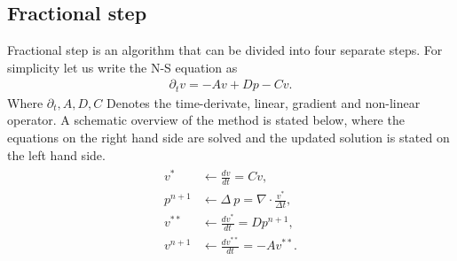 \subsection{Fractional step} 
\label{fracstep}

Fractional step is an algorithm that can be divided into four separate steps. For simplicity let us write the N-S
equation as 
\begin{align}
    \partial_t v = -Av + Dp - Cv.
    \label{eq:NSfracstep}
\end{align}
Where $\partial_t, A,D,C$ Denotes the time-derivate, linear, gradient and non-linear operator. 
A schematic overview of the method is stated below, where the equations on the right hand side are 
solved and the updated solution is stated on the left hand side.
\begin{align}
    \begin{split}
        v^* &\leftarrow \frac{dv}{dt}=Cv,\\
    p^{n+1} &\leftarrow \Delta\: p = \nabla \cdot \frac{v^*}{\Delta t},\\
    v^{**} &\leftarrow  \frac{dv^*}{dt} =Dp^{n+1},\\
    v^{n+1} &\leftarrow \frac{dv^{**}}{dt}= -Av^{**}.
    \end{split}
    \label{eq:fracstep}
\end{align}

